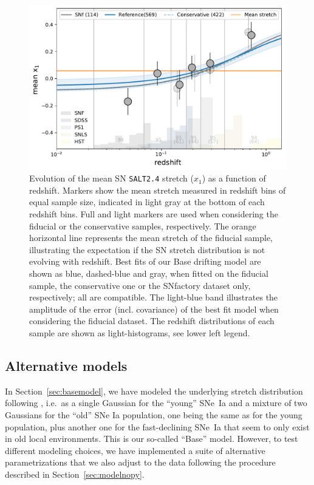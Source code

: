 \documentclass[]{aa} %
\newcommand{\mr}[1]{{\textcolor[rgb]{0.60,0.10,0.6}{#1}}}
\begin{document}
\begin{figure}
    \centering
    \includegraphics[width=0.7\linewidth]{Article_figures/stretchevol_all_vs_snf-hist_on.pdf}
    \caption{Evolution of the mean SN \textsc{\texttt{SALT2.4}} stretch ($x_1$)
        as a function of redshift. Markers show the mean stretch measured in
        redshift bins of equal sample size, indicated in light gray at the
        bottom of each redshift bins. Full and light markers are used when
        considering the fiducial or the conservative samples, respectively. The
        orange horizontal line represents the mean stretch of the fiducial
        sample, illustrating the expectation if the SN stretch distribution is
        not evolving with redshift. Best fits of our Base drifting model are
        shown as blue, dashed-blue and gray, when fitted on the fiducial sample,
        the conservative one or the SNfactory dataset only, respectively; all
        are compatible. The light-blue band illustrates the amplitude of the error (incl. covariance) of the best fit model when considering the fiducial dataset. \mr{The redshift distributions of each sample are shown as light-histograms, see lower left legend.}}
    \label{fig:modelall}
\end{figure}

\subsection{Alternative models}\label{sec:othermodel}

In Section~\ref{sec:basemodel}, we have modeled the underlying stretch
distribution following \cite{rigault2018}, i.e.\ as a single Gaussian for the
``young'' SNe~Ia and a mixture of two Gaussians for the ``old'' SNe Ia
population, one being the same as for the young population, plus another one for
the fast-declining SNe~Ia that seem to only exist in old local environments.
This is our so-called ``Base'' model. However, to test different modeling
choices, we have implemented a suite of alternative parametrizations that we
also adjust to the data following the procedure described in
Section~\ref{sec:modelnopy}. 
\end{document}
